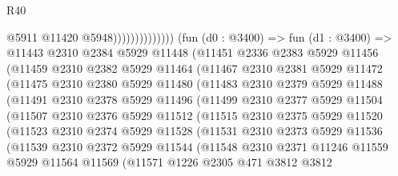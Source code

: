 \begin{lexlean}{R40}
\begin{coremodule}
                                    @5911
                                    @11420
                                    @5948))))))))))))))
        (fun (d0 : @3400) =>
        fun (d1 : @3400) =>
        @11443
          @2310
          @2384
          @5929
          @11448
          (@11451
            @2336
            @2383
            @5929
            @11456
            (@11459
              @2310
              @2382
              @5929
              @11464
              (@11467
                @2310
                @2381
                @5929
                @11472
                (@11475
                  @2310
                  @2380
                  @5929
                  @11480
                  (@11483
                    @2310
                    @2379
                    @5929
                    @11488
                    (@11491
                      @2310
                      @2378
                      @5929
                      @11496
                      (@11499
                        @2310
                        @2377
                        @5929
                        @11504
                        (@11507
                          @2310
                          @2376
                          @5929
                          @11512
                          (@11515
                            @2310
                            @2375
                            @5929
                            @11520
                            (@11523
                              @2310
                              @2374
                              @5929
                              @11528
                              (@11531
                                @2310
                                @2373
                                @5929
                                @11536
                                (@11539
                                  @2310
                                  @2372
                                  @5929
                                  @11544
                                  (@11548
                                    @2310
                                    @2371
                                    @11246
                                    @11559
                                    @5929
                                    @11564
                                    @11569
                                    (@11571
                                      @1226
                                      @2305
                                      @471
                                      @3812
                                      @3812

\end{coremodule}
\end{lexlean}
